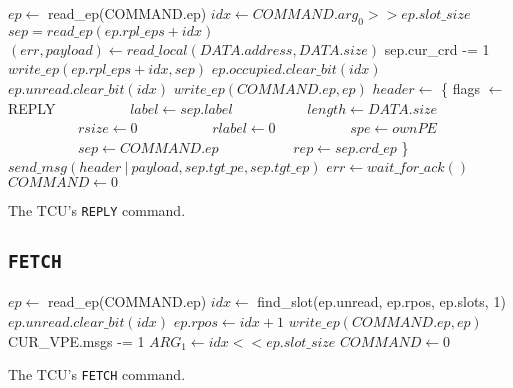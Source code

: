 \begin{algorithm}[H]
    $ep \gets$ read\_ep(COMMAND.ep)\;
    \extend{}
    \BlankLine
    $idx \gets COMMAND.arg_0 >> ep.slot\_size$\;
    $sep = read\_ep(ep.rpl\_eps + idx)$\;
    \BlankLine
    $(err, payload) \gets read\_local(DATA.address, DATA.size)$\;
    \BlankLine
    sep.cur\_crd -= 1\;
    $write\_ep(ep.rpl\_eps + idx, sep)$\;
    \BlankLine
    \extend{}
    \BlankLine
    $ep.occupied.clear\_bit(idx)$\;
    $ep.unread.clear\_bit(idx)$\;
    $write\_ep(COMMAND.ep, ep)$\;
    \BlankLine
    $header \gets$ \{ flags $\gets$ REPLY\;
    $\quad\quad\quad\quad\quad label \gets sep.label$\;
    $\quad\quad\quad\quad\quad length \gets DATA.size$\;
    $\quad\quad\quad\quad\quad rsize \gets 0$\;
    $\quad\quad\quad\quad\quad rlabel \gets 0$\;
    $\quad\quad\quad\quad\quad spe \gets ownPE$\;
    $\quad\quad\quad\quad\quad sep \gets COMMAND.ep$\;
    $\quad\quad\quad\quad\quad rep \gets sep.crd\_ep$ \}\;
    $send\_msg(header\ |\ payload, sep.tgt\_pe, sep.tgt\_ep)$\;
    $err \gets wait\_for\_ack()$\;
    \BlankLine
    $COMMAND \gets 0$\;
    \caption{The TCU's \texttt{REPLY} command.}
\end{algorithm}

\subsection{\texttt{FETCH}}

\begin{algorithm}[H]
    $ep \gets$ read\_ep(COMMAND.ep)\;
    \extend{}
    \BlankLine
    $idx \gets$ find\_slot(ep.unread, ep.rpos, ep.slots, 1)\;
    $ep.unread.clear\_bit(idx)$\;
    $ep.rpos \gets idx + 1$\;
    $write\_ep(COMMAND.ep, ep)$\;
    \BlankLine
    CUR\_VPE.msgs -= 1\;
    \extend{}
    \BlankLine
    $ARG_1 \gets idx << ep.slot\_size$\;
    $COMMAND \gets 0$\;
    \caption{The TCU's \texttt{FETCH} command.}
\end{algorithm}

